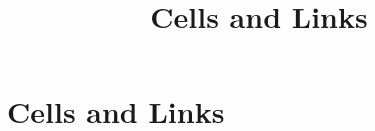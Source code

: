 \documentclass[../../OAE-SPEC-MAIN.tex]{subfiles}
\title{Cells and Links}
\begin{document}
\chapter{Cells and Links}\label{sec:cells-and-links}












\end{document}
